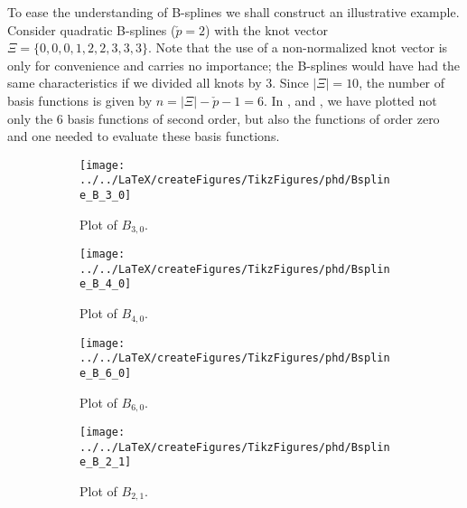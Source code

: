 To ease the understanding of B-splines we shall construct an illustrative example. Consider quadratic B-splines ($\check{p}=2$) with the knot vector $\Xi = \{0, 0, 0, 1, 2, 2, 3, 3, 3\}$. Note that the use of a non-normalized knot vector is only for convenience and carries no importance; the B-splines would have had the same characteristics if we divided all knots by 3. Since $|\Xi|=10$, the number of basis functions is given by $n=|\Xi|-\check{p}-1=6$. In ,  and , we have plotted not only the 6 basis functions of second order, but also the functions of order zero and one needed to evaluate these basis functions.
\begin{figure}
        \centering
        \begin{subfigure}{0.33\textwidth}
        	\centering
			\texttt{[image: ../../LaTeX/createFigures/TikzFigures/phd/Bspline\_B\_3\_0]}
            \caption{Plot of $B_{3,0}$.}
        \end{subfigure}%
        \hspace*{0.005\textwidth}%
        \begin{subfigure}{0.33\textwidth}
        	\centering
			\texttt{[image: ../../LaTeX/createFigures/TikzFigures/phd/Bspline\_B\_4\_0]}
            \caption{Plot of $B_{4,0}$.}
        \end{subfigure}%
        \hspace*{0.005\textwidth}%
        \begin{subfigure}{0.33\textwidth}
        	\centering
			\texttt{[image: ../../LaTeX/createFigures/TikzFigures/phd/Bspline\_B\_6\_0]}
            \caption{Plot of $B_{6,0}$.}
        \end{subfigure}
        \caption[Plot of B-splines with $\check{p}=0$]{Plot of the non-zero B-splines of order zero, where the knot vector is given by $\Xi = \{0, 0, 0, 1, 2, 2, 3, 3, 3\}$. Note that $B_{j,0}\equiv 0$ for $j\in\{1,2,5,6,7,8\}$.}   
        \label{Fig:Bsplines_p0}   
		\par\bigskip	
		\par\bigskip	
        \begin{subfigure}{0.33\textwidth}
       		\centering
			\texttt{[image: ../../LaTeX/createFigures/TikzFigures/phd/Bspline\_B\_2\_1]}
            \caption{Plot of $B_{2,1}$.}
        \end{subfigure}%
        \hspace*{0.005\textwidth}%
        \begin{subfigure}{0.33\textwidth}
       		\centering

\end{subfigure}
\end{figure}
